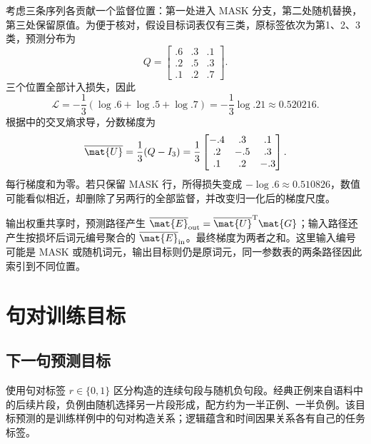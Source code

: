 \documentclass[../textbook.tex]{subfiles}
\begin{document}
\begin{example}
考虑三条序列各贡献一个监督位置：第一处进入 MASK 分支，第二处随机替换，第三处保留原值。为便于核对，假设目标词表仅有三类，原标签依次为第1、2、3类，预测分布为
\begin{equation*}
 Q=\begin{bmatrix}.6&.3&.1\\.2&.5&.3\\.1&.2&.7\end{bmatrix}.
\end{equation*}
三个位置全部计入损失，因此
\begin{equation*}
 \mathcal L=-\frac13(\log .6+\log .5+\log .7)
 =-\frac13\log .21\approx0.520216.
\end{equation*}
根据中的交叉熵求导，分数梯度为
\begin{equation*}
 \overline{\mat{U}}=\frac13(Q-I_3)=\frac13
 \begin{bmatrix}-.4&.3&.1\\.2&-.5&.3\\.1&.2&-.3\end{bmatrix}.
\end{equation*}
每行梯度和为零。若只保留 MASK 行，所得损失变成 $-\log .6\approx0.510826$，数值可能看似相近，却删除了另两行的全部监督，并改变归一化后的梯度尺度。

输出权重共享时，预测路径产生 $\overline{\mat{E}}_{\mathrm{out}}=\overline{\mat{U}}^{\mathrm{T}}\mat{G}$；输入路径还产生按损坏后词元编号聚合的 $\overline{\mat{E}}_{\mathrm{in}}$。最终梯度为两者之和。这里输入编号可能是 MASK 或随机词元，输出目标则仍是原词元，同一参数表的两条路径因此索引到不同位置。
\end{example}

\section{句对训练目标}
\optional
\subsection{下一句预测目标}
使用句对标签 $r\in\{0,1\}$ 区分构造的连续句段与随机负句段。经典正例来自语料中的后续片段，负例由随机选择另一片段形成，配方约为一半正例、一半负例。该目标预测的是训练样例中的句对构造关系；逻辑蕴含和时间因果关系各有自己的任务标签。
\end{document}
